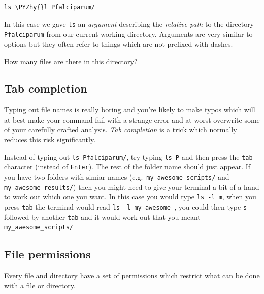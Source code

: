 \documentclass[11pt]{article}
\makeatletter
\def\PYZhy{\char`\-}
\newcommand{\boxspacing}{\kern\kvtcb@left@rule\kern\kvtcb@boxsep}
\newcommand{\prompt}[4]{
       \ttfamily\llap{{\color{#2}\LARGE\faKeyboardO\hspace{3pt}#4}}\vspace{-\baselineskip}
    }
\makeatother
\begin{document}
    \begin{tcolorbox}[breakable, size=fbox, boxrule=1pt, pad at break*=1mm,colback=cellbackground, colframe=cellborder]
\prompt{In}{incolor}{ }{\boxspacing}
\begin{Verbatim}[commandchars=\\\{\}]
ls \PYZhy{}l Pfalciparum/
\end{Verbatim}
\end{tcolorbox}

    In this case we gave \texttt{ls} an \textit{argument} describing the
\textit{relative path} to the directory \texttt{Pfalciparum} from our
current working directory. Arguments are very similar to options but
they often refer to things which are not prefixed with dashes.

How many files are there in this directory?

    \hypertarget{tab-completion}{%
\subsection{Tab completion}\label{tab-completion}}

Typing out file names is really boring and you're likely to make typos
which will at best make your command fail with a strange error and at
worst overwrite some of your carefully crafted analysis. \textit{Tab
completion} is a trick which normally reduces this risk significantly.

Instead of typing out \texttt{ls\ Pfalciparum/}, try typing
\texttt{ls\ P} and then press the \texttt{tab} character (instead of
\texttt{Enter}). The rest of the folder name should just appear. If you
have two folders with simiar names (e.g.~\texttt{my\_awesome\_scripts/}
and \texttt{my\_awesome\_results/}) then you might need to give your
terminal a bit of a hand to work out which one you want. In this case
you would type \texttt{ls\ -l\ m}, when you press \texttt{tab} the
terminal would read \texttt{ls\ -l\ my\_awesome\_}, you could then type
\texttt{s} followed by another \texttt{tab} and it would work out that
you meant \texttt{my\_awesome\_scripts/}

    \hypertarget{file-permissions}{%
\subsection{File permissions}\label{file-permissions}}

Every file and directory have a set of permissions which restrict what
can be done with a file or directory.
\end{document}
